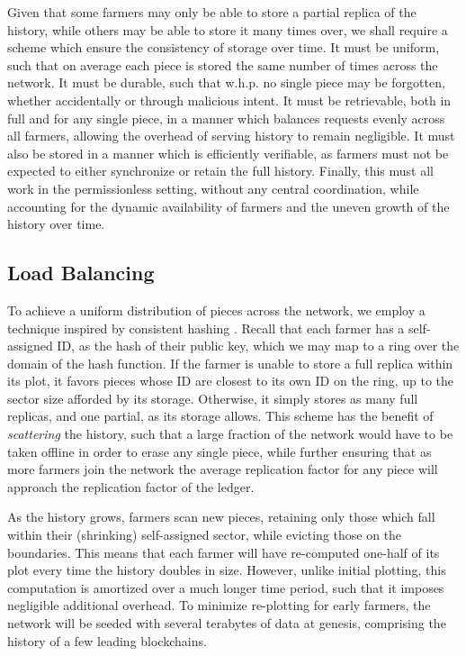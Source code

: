 \documentclass[conference]{IEEEtran}
\begin{document}
Given that some farmers may only be able to store a partial replica of the history, while others may be able to store it many times over, we shall require a scheme which ensure the consistency of storage over time. It must be uniform, such that on average each piece is stored the same number of times across the network. It must be durable, such that w.h.p. no single piece may be forgotten, whether accidentally or through malicious intent. It must be retrievable, both in full and for any single piece, in a manner which balances requests evenly across all farmers, allowing the overhead of serving history to remain negligible. It must also be stored in a manner which is efficiently verifiable, as farmers must not be expected to either synchronize or retain the full history. Finally, this must all work in the permissionless setting, without any central coordination, while accounting for the dynamic availability of farmers and the uneven growth of the history over time. 

\subsection{Load Balancing}

To achieve a uniform distribution of pieces across the network, we employ a technique inspired by consistent hashing \cite{karger1997consistent}. Recall that each farmer has a self-assigned ID, as the hash of their public key, which we may map to a ring over the domain of the hash function. If the farmer is unable to store a full replica within its plot, it favors pieces whose ID are closest to its own ID on the ring, up to the sector size afforded by its storage. Otherwise, it simply stores as many full replicas, and one partial, as its storage allows. This scheme has the benefit of \textit{scattering} the history, such that a large fraction of the network would have to be taken offline in order to erase any single piece, while further ensuring that as more farmers join the network the average replication factor for any piece will approach the replication factor of the ledger. 

As the history grows, farmers scan new pieces, retaining only those which fall within their (shrinking) self-assigned sector, while evicting those on the boundaries. This means that each farmer will have re-computed one-half of its plot every time the history doubles in size. However, unlike initial plotting, this computation is amortized over a much longer time period, such that it imposes negligible additional overhead. To minimize re-plotting for early farmers, the network will be seeded with several terabytes of data at genesis, comprising the history of a few leading blockchains.
\end{document}
